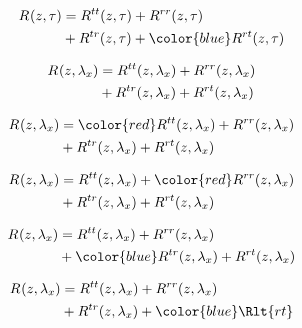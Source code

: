 \begin{frame}
\begin{align}
\nonumber \Rct{} &= {\Rct{tt}} + {\Rct{rr}}\\
\nonumber             &+ { \Rct{tr} }+ {\color{blue}  \Rct{rt}}
\end{align}
\end{frame}





\begin{frame}
\begin{align}
\nonumber R^{}(z,\lambda_x) &= { R^{tt}(z,\lambda_x)} + {R^{rr}(z,\lambda_x)}\\
\nonumber             &+ { R^{tr}(z,\lambda_x) }+ { R^{rt}(z,\lambda_x)}
\end{align}
\end{frame}


\begin{frame}
\begin{align}
\nonumber \Rcl{} &= {\color{red} \Rcl{tt}} + {\Rcl{rr}}\\
\nonumber             &+ { \Rcl{tr} }+ { \Rcl{rt}}
\end{align}
\end{frame}


\begin{frame}
\begin{align}
\nonumber \Rcl{} &= {\Rcl{tt}} + {\color{red} \Rcl{rr}}\\
\nonumber             &+ { \Rcl{tr} }+ { \Rcl{rt}}
\end{align}
\end{frame}


\begin{frame}
\begin{align}
\nonumber \Rcl{} &= {\Rcl{tt}} + {\Rcl{rr}}\\
\nonumber             &+ {\color{blue}  \Rcl{tr} }+ { \Rcl{rt}}
\end{align}
\end{frame}


\begin{frame}
\begin{align}
\nonumber \Rcl{} &= {\Rcl{tt}} + {\Rcl{rr}}\\
\nonumber             &+ { \Rcl{tr} }+ {\color{blue}  \Rlt{rt}}
\end{align}
\end{frame}









